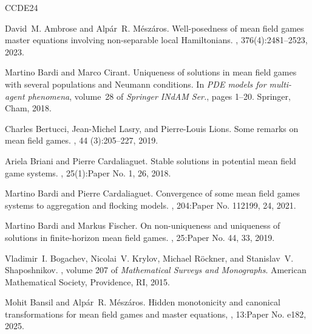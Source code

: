\documentclass{amsart}
\theoremstyle{remark}
\theoremstyle{definition}
\theoremstyle{Claim}
\theoremstyle{plain}
\begin{document}


\begin{thebibliography}{CCDE24}

David~M. Ambrose and Alp\'ar~R. M\'esz\'aros.
\newblock Well-posedness of mean field games master equations involving
  non-separable local {H}amiltonians.
, 376(4):2481--2523, 2023.

Martino Bardi and Marco Cirant.
\newblock Uniqueness of solutions in mean field games with several populations
  and {N}eumann conditions.
\newblock In {\em P{DE} models for multi-agent phenomena}, volume~28 of {\em
  Springer INdAM Ser.}, pages 1--20. Springer, Cham, 2018.

Charles Bertucci, Jean-Michel Lasry, and Pierre-Louis Lions.
\newblock Some remarks on mean field games.
, 44 (3):205--227, 2019.


Ariela Briani and Pierre Cardaliaguet.
\newblock Stable solutions in potential mean field game systems.
, 25(1):Paper No.
  1, 26, 2018.

Martino Bardi and Pierre Cardaliaguet.
\newblock Convergence of some mean field games systems to aggregation and
  flocking models.
, 204:Paper No. 112199, 24, 2021.

Martino Bardi and Markus Fischer.
\newblock On non-uniqueness and uniqueness of solutions in finite-horizon mean
  field games.
, 25:Paper No. 44, 33, 2019.

Vladimir~I. Bogachev, Nicolai~V. Krylov, Michael R\"ockner, and Stanislav~V.
  Shaposhnikov.
, volume 207 of {\em
  Mathematical Surveys and Monographs}.
\newblock American Mathematical Society, Providence, RI, 2015.

Mohit Bansil and Alp\'{a}r~R. M\'{e}sz\'{a}ros.
\newblock Hidden monotonicity and canonical transformations for mean field games and master equations, , 13:Paper No. e182, 2025.



\end{thebibliography}
\end{document}
